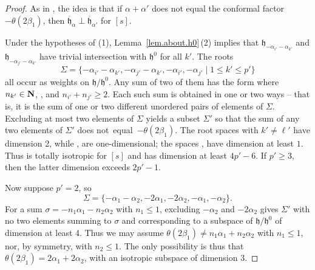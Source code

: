 \documentclass[10pt,a4paper]{amsart}
\numberwithin{equation}{section}
\theoremstyle{definition}
\def\N{{\bf N}}
\newcommand{\lieh}{\mathfrak{h}}
\begin{document}
\begin{proof}
As in \cite[Observation 3]{pecastaing.rank1}, the idea is that if $\alpha + \alpha'$ does not equal the conformal factor~$- \theta(2 \beta_1)$, then $\overline{\lieh}_\alpha \perp \overline{\lieh}_{\alpha'}$ for $[s]$.

Under the hypotheses of (1), Lemma~\ref{lem.about.h0}\,(2) implies that ${\lieh}_{- \alpha_{i'} - \alpha_{k'}}$ and ${\lieh}_{- \alpha_{j'} - \alpha_{k'}}$ have trivial intersection with $\lieh^0$ for all $k'$. The roots
\[
\Sigma = \{ - \alpha_{i'} - \alpha_{k'}, - \alpha_{j'} - \alpha_{k'}, - \alpha_{i'}, - \alpha_{j'} \mid 1 \leq k' \leq p' \}
\]
all occur as weights on $\lieh/\lieh^0$. Any sum of two of them has the form  where $n_{k'} \in \N$, , and $n_{i'} + n_{j'} \geq 2$.
Each such sum is obtained in one or two ways -- that is, it is the sum of one or two different unordered pairs of elements of $\Sigma$. Excluding at most two elements of $\Sigma$ yields a subset $\Sigma'$ so that the sum of any two elements of $\Sigma'$ does not~equal~$- \theta(2 \beta_1)$. The root spaces \smash{$\lieh_{- \alpha_{k'} - \alpha_{\ell'}}$} with $k' \neq \ell'$ have dimension 2, while \smash{$\lieh_{- 2 \alpha_{i'}}$}, \smash{$\lieh_{- 2 \alpha_{j'}}$} are one-dimensional; the spaces \smash{$\overline{\lieh}_{- \alpha_{i'}}$}, \smash{$\overline{\lieh}_{- \alpha_{j'}}$} have dimension at least $1$. Thus \smash{$\bigoplus_{\sigma \in \Sigma'} \overline{\lieh}_\sigma$} is totally isotropic for $[s]$ and has dimension at least $4p'-6$. If $p' \geq 3$, then the latter dimension exceeds $2p'-1$.

Now suppose $p'=2$, so
\[\Sigma = \{ -\alpha_1 - \alpha_2, - 2 \alpha_1, - 2 \alpha_2, - \alpha_1, - \alpha_2 \}.\]
For a sum $\sigma = - n_1 \alpha_1 - n_2 \alpha_2$ with $n_1 \leq 1$, excluding $- \alpha_2$ and $- 2 \alpha_2$ gives $\Sigma'$ with no two elements summing to $\sigma$ and corresponding to a subspace of $\lieh/\lieh^0$ of dimension at least 4. Thus we may assume $ \theta(2 \beta_1) \neq n_1 \alpha_1 + n_2 \alpha_2$ with $n_1 \leq 1$, nor, by symmetry, with $n_2 \leq 1$. The only possibility is thus that $\theta(2 \beta_1) = 2 \alpha_1 + 2 \alpha_2$, with an isotropic subspace of dimension 3.


\end{proof}
\end{document}
